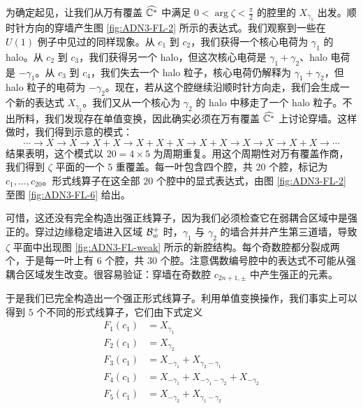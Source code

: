 为确定起见，让我们从万有覆盖 $\widehat{\mathbb{C}^*}$ 中满足 $0<\arg\zeta<\frac{\pi}{2}$ 的腔里的 $X_{\gamma_1}$ 出发。顺时针方向的穿墙产生图 \ref{fig:ADN3-FL-2} 所示的表达式。我们观察到一些在 $U(1)$ 例子中见过的同样现象。从 $c_1$ 到 $c_2$，我们获得一个核心电荷为 $\gamma_1$ 的 halo。从 $c_2$ 到 $c_3$，我们获得另一个 halo，但这次核心电荷是 $\gamma_1+\gamma_2$、halo 电荷是 $-\gamma_1$。从 $c_3$ 到 $c_4$，我们失去一个 halo 粒子，核心电荷仍解释为 $\gamma_1+\gamma_2$，但 halo 粒子的电荷为 $-\gamma_2$。现在，若从这个腔继续沿顺时针方向走，我们会生成一个新的表达式 $X_{\gamma_2}$。我们又从一个核心为 $\gamma_2$ 的 halo 中移走了一个 halo 粒子。不出所料，我们发现存在单值变换，因此确实必须在万有覆盖 $\widehat{\mathbb{C}^*}$ 上讨论穿墙。这样做时，我们得到示意的模式：
\begin{equation}
\cdots \to X \to X \to X+X \to X+X+X \to X+X \to X \to X \to X+X \to \cdots
\end{equation}
结果表明，这个模式以 $20=4\times 5$ 为周期重复。用这个周期性对万有覆盖作商，我们得到 $\zeta$ 平面的一个 $5$ 重覆盖。每一叶包含四个腔，共 $20$ 个腔，标记为 $c_1,\dots,c_{20}$。形式线算子在这全部 $20$ 个腔中的显式表达式，由图 \ref{fig:ADN3-FL-2} 至图 \ref{fig:ADN3-FL-6} 给出。


可惜，这还没有完全构造出强正线算子，因为我们必须检查它在弱耦合区域中是强正的。穿过边缘稳定墙进入区域 $\mathcal{B}_w^+$ 时，$\gamma_1$ 与 $\gamma_2$ 的墙合并并产生第三道墙，导致 $\zeta$ 平面中出现图 \ref{fig:ADN3-FL-weak} 所示的新腔结构。每个奇数腔都分裂成两个，于是每一叶上有 $6$ 个腔，共 $30$ 个腔。注意偶数编号腔中的表达式不可能从强耦合区域发生改变。很容易验证：穿墙在奇数腔 $c_{2n+1,\pm}$ 中产生强正的元素。

于是我们已完全构造出一个强正形式线算子。利用单值变换操作，我们事实上可以得到 $5$ 个不同的形式线算子，它们由下式定义
\begin{equation}
\begin{split}
F_1(c_1) & = X_{\gamma_1} \\
F_2(c_1) & = X_{\gamma_2} \\
F_3(c_1) & = X_{-\gamma_1} + X_{\gamma_2-\gamma_1} \\
F_4(c_1) & = X_{-\gamma_1} + X_{-\gamma_1-\gamma_2} + X_{-\gamma_2} \\
F_5(c_1) & = X_{-\gamma_2} + X_{\gamma_1-\gamma_2}
\end{split}
\end{equation}

